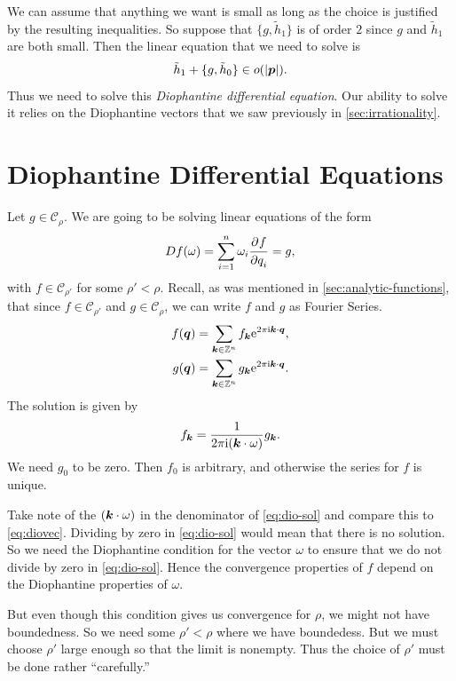 \documentclass[twoside,letterpaper,10pt]{article}
\numberwithin{equation}{section}
\begin{document}
We can assume that anything we want is small as long as the choice is justified
by the resulting inequalities.
So suppose that $\{g, \tilde{h}_1\}$ is of order $2$ since $g$ and $\tilde{h}_1$
are both small.
Then the linear equation that we need to solve is
\begin{equation}
  \label{eq:dio-diff-first}
  \tilde{h}_1 + \{g, \tilde{h}_0\} \in o(|\bm{p}|).
\end{equation}
Thus we need to solve this \emph{Diophantine differential equation}.
Our ability to solve it relies on the Diophantine vectors that we saw previously
in \cref{sec:irrationality}.

\section{Diophantine Differential Equations}
\label{sec:dioph-diff-equat}

Let $g \in \mathcal{C}_{\rho}$.
We are going to be solving linear equations of the form
\begin{equation*}
  \mathop{}\!D f(\omega) = \sum_{i = 1}^n \omega_i \frac{\strut\partial^{}f}{\strut\partial q_i^{}} = g,
\end{equation*}
with $f \in \mathcal{C}_{\rho'}$ for some $\rho' < \rho$.
Recall, as was mentioned in \cref{sec:analytic-functions}, that since $f \in
\mathcal{C}_{\rho'}$ and $g \in \mathcal{C}_{\rho}$, we can write $f$ and $g$ as
Fourier Series.
\begin{align*}
  f(\bm{q}) &= \sum_{\bm{k} \in \mathbb{Z}^n} f_{\bm{k}} \mathrm{e}^{2 \pi \mathrm{i} \bm{k} \cdot
    \bm{q}},\\
  g(\bm{q}) &= \sum_{\bm{k} \in \mathbb{Z}^n} g_{\bm{k}} \mathrm{e}^{2 \pi \mathrm{i} \bm{k} \cdot \bm{q}}.
\end{align*}
The solution is given by
\begin{equation}
  \label{eq:dio-sol}
  f_{\bm{k}} = \frac{1}{2 \pi \mathrm{i} (\bm{k} \cdot \omega)}g_{\bm{k}}.
\end{equation}
We need $g_0$ to be zero.
Then $f_0$ is arbitrary, and otherwise the series for $f$ is unique.

Take note of the $(\bm{k} \cdot \omega)$ in the denominator of \cref{eq:dio-sol}
and compare this to \cref{eq:diovec}.
Dividing by zero in \cref{eq:dio-sol} would mean that there is no solution.
So we need the Diophantine condition for the vector $\omega$ to ensure that we
do not divide by zero in \cref{eq:dio-sol}.
Hence the convergence properties of $f$ depend on the Diophantine properties of
$\omega$.

But even though this condition gives us convergence for $\rho$, we might not
have boundedness.
So we need some $\rho' < \rho$ where we have boundedess.
But we must choose $\rho'$ large enough so that the limit is nonempty.
Thus the choice of $\rho'$ must be done rather ``carefully.''
\end{document}
